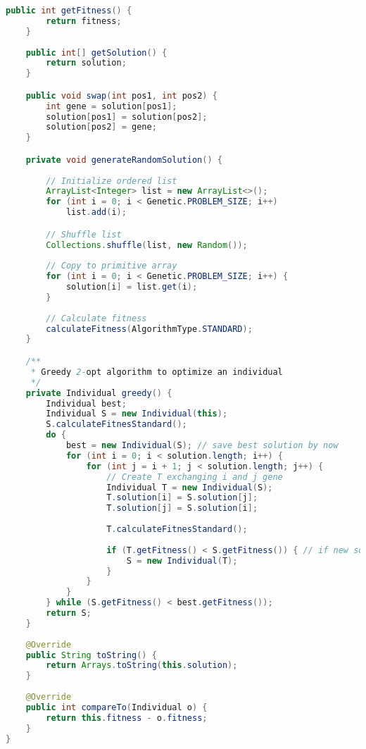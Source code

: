 \begin{lstlisting}[language=java,caption={Individual.java},captionpos=b]
    public int getFitness() {
        return fitness;
    }
    
    public int[] getSolution() {
        return solution;
    }

    public void swap(int pos1, int pos2) {
        int gene = solution[pos1];
        solution[pos1] = solution[pos2];
        solution[pos2] = gene;
    }

    private void generateRandomSolution() {
        
        // Initialize ordered list
        ArrayList<Integer> list = new ArrayList<>();
        for (int i = 0; i < Genetic.PROBLEM_SIZE; i++)
            list.add(i);

        // Shuffle list
        Collections.shuffle(list, new Random());
        
        // Copy to primitive array
        for (int i = 0; i < Genetic.PROBLEM_SIZE; i++) {
            solution[i] = list.get(i);
        }
                
        // Calculate fitness
        calculateFitness(AlgorithmType.STANDARD);
    }

    /**
     * Greedy 2-opt algorithm to optimize an individual
     */
    private Individual greedy() {
        Individual best;
        Individual S = new Individual(this);
        S.calculateFitnesStandard();
        do {
            best = new Individual(S); // save best solution by now
            for (int i = 0; i < solution.length; i++) {
                for (int j = i + 1; j < solution.length; j++) {
                    // Create T exchanging i and j gene
                    Individual T = new Individual(S);
                    T.solution[i] = S.solution[j];
                    T.solution[j] = S.solution[i];
                    
                    T.calculateFitnesStandard();
                    
                    if (T.getFitness() < S.getFitness()) { // if new solution is better than older updates
                        S = new Individual(T);
                    }
                }
            }
        } while (S.getFitness() < best.getFitness());
        return S;
    }
    
    @Override
    public String toString() {
        return Arrays.toString(this.solution);
    }
    
    @Override
    public int compareTo(Individual o) {
        return this.fitness - o.fitness;
    }
}
\end{lstlisting}